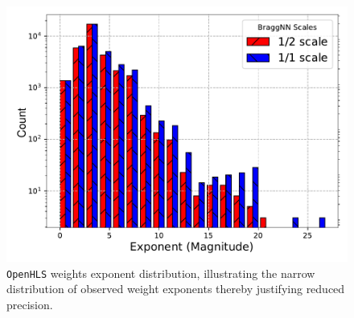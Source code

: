 \documentclass[10pt]{sig-alternate}
\begin{document}
\begin{figure}[tbh]
\centering{}
\includegraphics[width=.8\columnwidth,trim=5mm 4mm 4mm 3mm,clip]{figures/exp_hist}
\caption{\texttt{OpenHLS} weights exponent distribution, illustrating the narrow distribution of observed weight exponents thereby justifying reduced precision.\label{fig:OpenHLS-framework-overview.-1}}
\end{figure}
\end{document}
